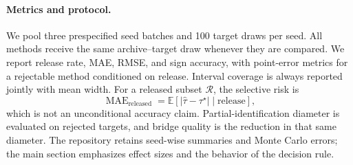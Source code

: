\documentclass[11pt]{article}
\numberwithin{equation}{section}
\newcommand{\1}{\mathbf 1}
\newcommand{\abs}[1]{\left\lvert #1\right\rvert}
\begin{document}
\paragraph{Metrics and protocol.}
We pool three prespecified seed batches and 100 target draws per seed.  All methods receive the same archive--target draw whenever they are compared.  We report release rate, MAE, RMSE, and sign accuracy, with point-error metrics for a rejectable method conditioned on release.  Interval coverage is always reported jointly with mean width.  For a released subset $\mathcal R$, the selective risk is
\[
\operatorname{MAE}_{\mathrm{released}}
 =\mathbb E\!\left[\abs{\widehat\tau-\tau^\star}\mid \text{release}\right],
\]
which is not an unconditional accuracy claim.  Partial-identification diameter is evaluated on rejected targets, and bridge quality is the reduction in that same diameter.  The repository retains seed-wise summaries and Monte Carlo errors; the main section emphasizes effect sizes and the behavior of the decision rule.
\end{document}
